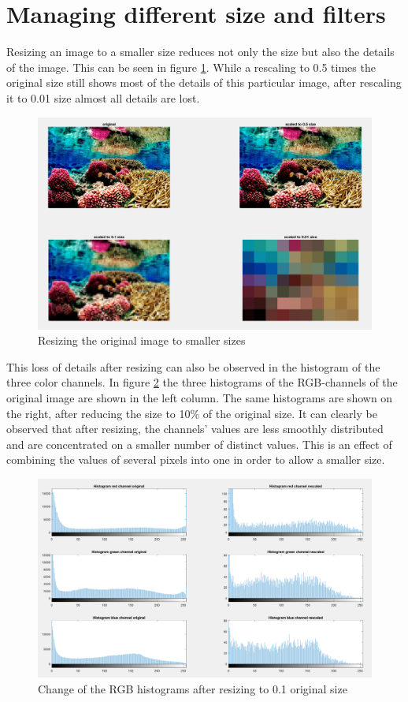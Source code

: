 \section{Managing different size and filters}

Resizing an image to a smaller size reduces not only the size but also the details of the image. This can be seen in figure \ref{fig:task5}. While a rescaling to 0.5 times the original size still shows most of the details of this particular image, after rescaling it to 0.01 size almost all details are lost.

\begin{figure}[!hbt]
  \includegraphics[width=\textwidth]{./img/task5.png}
  \caption{Resizing the original image to smaller sizes}
  \label{fig:task5}
\end{figure}

This loss of details after resizing can also be observed in the histogram of the three color channels. In figure \ref{fig:task6} the three histograms of the RGB-channels of the original image are shown in the left column. The same histograms are shown on the right, after reducing the size to 10\% of the original size. It can clearly be observed that after resizing, the channels' values are less smoothly distributed and are concentrated on a smaller number of distinct values. This is an effect of combining the values of several pixels into one in order to allow a smaller size. 

\begin{figure}[!hbt]
  \includegraphics[width=\textwidth]{./img/task6.png}
  \caption{Change of the RGB histograms after resizing to 0.1 original size}
  \label{fig:task6}
\end{figure}

